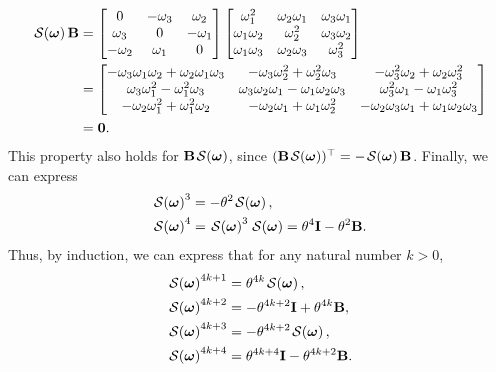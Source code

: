 \begin{align}
    \SL[\boldsymbol{\omega}]\mathbf{B} &= \begin{bmatrix}
        0 & -\omega_3 & \omega_2\\
        \omega_3 & 0 & -\omega_1 \\
        -\omega_2 & \omega_1 & 0
    \end{bmatrix}\begin{bmatrix}
        \omega_1^2 & \omega_2\omega_1 & \omega_3\omega_1\\
        \omega_1\omega_2 & \omega_2^2 & \omega_3\omega_2 \\
        \omega_1\omega_3 & \omega_2\omega_3 & \omega_3^2
    \end{bmatrix}\\
    &= \begin{bmatrix}
        -\omega_3\omega_1\omega_2 + \omega_2\omega_1\omega_3 & -\omega_3\omega_2^2+\omega_2^2\omega_3 & -\omega_3^2\omega_2 + \omega_2\omega_3^2\\
        \omega_3\omega_1^2-\omega_1^2\omega_3 & \omega_3\omega_2\omega_1 - \omega_1\omega_2\omega_3 & \omega_3^2\omega_1 - \omega_1\omega_3^2\\
        -\omega_2\omega_1^2 + \omega_1^2\omega_2 & -\omega_2\omega_1 + \omega_1\omega_2^2 & -\omega_2\omega_3\omega_1 + \omega_1\omega_2\omega_3
    \end{bmatrix}\\
    &=\mathbf{0}.
\end{align}
This property also holds for $\mathbf{B}\SL[\boldsymbol{\omega}]$, since $(\mathbf{B}\SL[\boldsymbol{\omega}])^\top=-\SL[\boldsymbol{\omega}]\mathbf{B}$. Finally, we can express
\begin{align}
    \SL[\boldsymbol{\omega}]^3 &= -\theta^2\SL[\boldsymbol{\omega}],\\
    \SL[\boldsymbol{\omega}]^4 &= \SL[\boldsymbol{\omega}]^3\SL[\boldsymbol{\omega}] = \theta^4\mathbf{I} - \theta^2\mathbf{B}.
\end{align}
Thus, by induction, we can express that for any natural number $k>0$,
\begin{align}
    \SL[\boldsymbol{\omega}]^{4k+1} &= \theta^{4k}\SL[\boldsymbol{\omega}],\\
    \SL[\boldsymbol{\omega}]^{4k+2} &= -\theta^{4k+2}\mathbf{I} + \theta^{4k}\mathbf{B},\\
    \SL[\boldsymbol{\omega}]^{4k+3} &= -\theta^{4k+2}\SL[\boldsymbol{\omega}],\\
    \SL[\boldsymbol{\omega}]^{4k+4} &= \theta^{4k+4}\mathbf{I} - \theta^{4k+2}\mathbf{B}.
\end{align}

